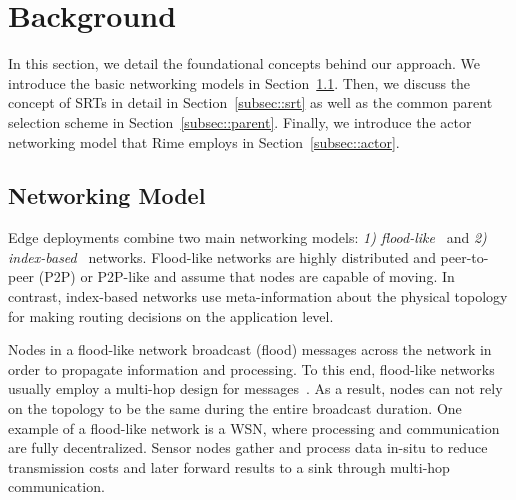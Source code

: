 \section{Background}
\label{sec:background}
In this section, we detail the foundational concepts behind our approach.
We introduce the basic networking models in Section~\ref{netw_model}.
Then, we discuss the concept of SRTs in detail in Section~\ref{subsec::srt} as well as the common parent selection scheme in Section~\ref{subsec::parent}. 
Finally, we introduce the actor networking model that Rime employs in Section~\ref{subsec::actor}.

\subsection{Networking Model} 
\label{netw_model}
Edge deployments combine two main networking models: \textit{1) flood-like}~\cite{levis2008emergence} and \textit{2) index-based}~\cite{pietzuch2006network} networks. Flood-like networks are highly distributed and peer-to-peer (P2P) or P2P-like and assume that nodes are capable of moving. In contrast, index-based networks use meta-information about the physical topology for making routing decisions on the application level.%

Nodes in a flood-like network broadcast (flood) messages across the network in order to propagate information and processing. To this end, flood-like networks usually employ a multi-hop design for messages~\cite{aggarwal2013managing}. 
As a result, nodes can not rely on the topology to be the same during the entire broadcast duration.
One example of a flood-like network is a WSN, where processing and communication are fully decentralized.
Sensor nodes gather and process data in-situ to reduce transmission costs and later forward results to a sink
through multi-hop communication.

